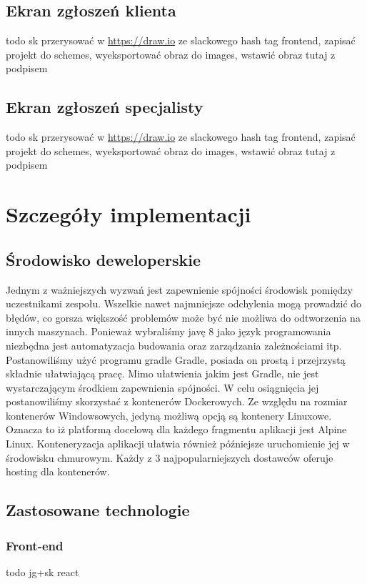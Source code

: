 \documentclass[10pt, titlepage, oneside, a4paper]{article}
\begin{document}
	\subsection{Ekran zgłoszeń klienta}
	todo sk przerysować w \url{https://draw.io} ze slackowego hash tag frontend, zapisać projekt do schemes, wyeksportować obraz do images, wstawić obraz tutaj z podpisem
	\newpage	
	
	\subsection{Ekran zgłoszeń specjalisty}
	todo sk przerysować w \url{https://draw.io} ze slackowego hash tag frontend, zapisać projekt do schemes, wyeksportować obraz do images, wstawić obraz tutaj z podpisem  
	\newpage  
  
	\section{Szczegóły implementacji}  
  
	\subsection{Środowisko deweloperskie}  
	Jednym z ważniejszych wyzwań jest zapewnienie spójności środowisk pomiędzy uczestnikami zespołu. Wszelkie
	nawet najmniejsze odchylenia mogą prowadzić do błędów, co gorsza większość problemów może być nie możliwa
	do odtworzenia na innych maszynach. Ponieważ wybraliśmy javę 8 jako język programowania niezbędna jest
	automatyzacja budowania oraz zarządzania zależnościami itp. Postanowiliśmy użyć programu gradle Gradle,
	posiada on prostą i przejrzystą składnie ułatwiającą pracę. Mimo ułatwienia jakim jest Gradle, nie jest
	wystarczającym środkiem zapewnienia spójności. W celu osiągnięcia jej postanowiliśmy skorzystać z
	kontenerów Dockerowych. Ze względu na rozmiar kontenerów Windowsowych, jedyną możliwą opcją są kontenery
	Linuxowe. Oznacza to iż platformą docelową dla każdego fragmentu aplikacji jest Alpine Linux. Konteneryzacja
	aplikacji ułatwia również późniejsze uruchomienie jej w środowisku chmurowym. Każdy z 3 najpopularniejszych
	dostawców oferuje hosting dla kontenerów.
  
	\subsection{Zastosowane technologie}

	\subsubsection{Front-end}
	todo jg+sk react
	
\end{document}
